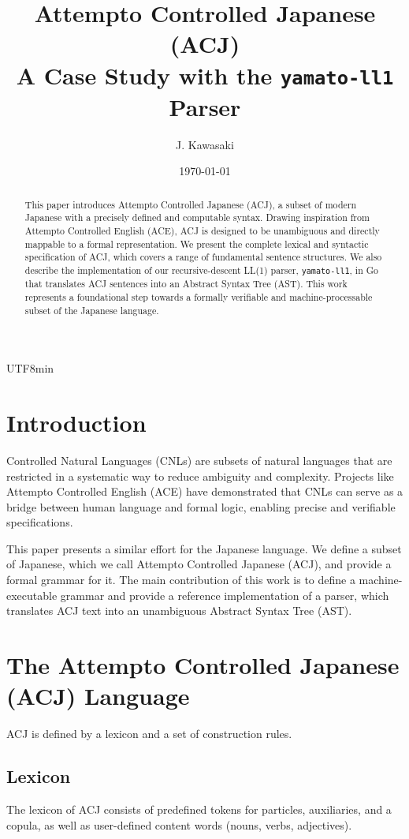 \documentclass{article}
\title{Attempto Controlled Japanese (ACJ) \\ \large A Case Study with the \texttt{yamato-ll1} Parser}
\author{J. Kawasaki}
\date{\today}
\begin{document}
\begin{CJK}{UTF8}{min}

\maketitle

\begin{abstract}
This paper introduces Attempto Controlled Japanese (ACJ), a subset of modern Japanese with a precisely defined and computable syntax. Drawing inspiration from Attempto Controlled English (ACE), ACJ is designed to be unambiguous and directly mappable to a formal representation. We present the complete lexical and syntactic specification of ACJ, which covers a range of fundamental sentence structures. We also describe the implementation of our recursive-descent LL(1) parser, \texttt{yamato-ll1}, in Go that translates ACJ sentences into an Abstract Syntax Tree (AST). This work represents a foundational step towards a formally verifiable and machine-processable subset of the Japanese language.
\end{abstract}

\section{Introduction}
Controlled Natural Languages (CNLs) are subsets of natural languages that are restricted in a systematic way to reduce ambiguity and complexity. Projects like Attempto Controlled English (ACE) have demonstrated that CNLs can serve as a bridge between human language and formal logic, enabling precise and verifiable specifications.

This paper presents a similar effort for the Japanese language. We define a subset of Japanese, which we call Attempto Controlled Japanese (ACJ), and provide a formal grammar for it. The main contribution of this work is to define a machine-executable grammar and provide a reference implementation of a parser, which translates ACJ text into an unambiguous Abstract Syntax Tree (AST).

\section{The Attempto Controlled Japanese (ACJ) Language}
ACJ is defined by a lexicon and a set of construction rules.

\subsection{Lexicon}
The lexicon of ACJ consists of predefined tokens for particles, auxiliaries, and a copula, as well as user-defined content words (nouns, verbs, adjectives).


\end{CJK}
\end{document}
